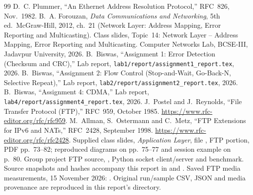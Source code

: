 \begin{thebibliography}{99}
\small
\setlength{\itemsep}{1pt}
\setlength{\parskip}{0pt}
 D.~C. Plummer, ``An Ethernet Address Resolution Protocol,'' RFC~826, Nov.\ 1982.
 B.~A. Forouzan, \emph{Data Communications and Networking}, 5th ed.\ McGraw-Hill, 2012, ch.~21 (Network Layer: Address Mapping, Error Reporting and Multicasting).
 Class slides, Topic~14: Network Layer -- Address Mapping, Error Reporting and Multicasting. Computer Networks Lab, BCSE-III, Jadavpur University, 2026.
 B.~Biswas, ``Assignment 1: Error Detection (Checksum and CRC),'' Lab report, \texttt{lab1/report/assignment1\_report.tex}, 2026.
 B.~Biswas, ``Assignment 2: Flow Control (Stop-and-Wait, Go-Back-N, Selective Repeat),'' Lab report, \texttt{lab2/report/assignment2\_report.tex}, 2026.
 B.~Biswas, ``Assignment 4: CDMA,'' Lab report, \texttt{lab4/report/assignment4\_report.tex}, 2026.
 J.~Postel and J.~Reynolds, ``File Transfer Protocol (FTP),'' RFC~959, October 1985. \url{https://www.rfc-editor.org/rfc/rfc959}.
 M.~Allman, S.~Ostermann and C.~Metz, ``FTP Extensions for IPv6 and NATs,'' RFC~2428, September 1998. \url{https://www.rfc-editor.org/rfc/rfc2428}.
 Supplied class slides, \emph{Application Layer}, file , FTP portion, PDF pp.~73--82; reproduced diagrams on pp.~75--77 and session example on p.~80.
 Group project FTP source, , Python socket client/server and benchmark. Source snapshots and hashes accompany this report in  and .
 Saved FTP media measurements, 15 November 2026: . Original run/sample CSV, JSON and media provenance are reproduced in this report's  directory.
\end{thebibliography}
